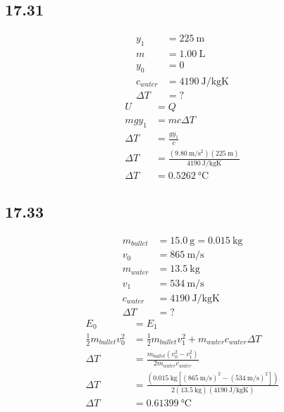 \documentclass{article}
\begin{document}
\subsection{17.31}

\begin{align*}
	y_1 & = \SI{225}{\meter} \\
	m & = \SI{1.00}{\liter} \\
	y_0 & = 0 \\
	c_{water} & = \SI{4190}{\joule \per \kilogram \kelvin} \\
	\Delta T & = ?
\end{align*}
\begin{align*}
	U & = Q \\
	mgy_1 & = mc\Delta T \\
	\Delta T & = \frac{ gy_1 }{ c } \\
	\Delta T & = \frac{ (\SI{9.80}{\meter \per \second \squared})(\SI{225}{\meter}) }{ \SI{4190}{\joule \per \kilogram \kelvin} } \\
	\Delta T & = \SI{0.5262}{\celsius}
\end{align*}

\subsection{17.33}

\begin{align*}
	m_{bullet} & = \SI{15.0}{\gram} = \SI{0.015}{\kilogram} \\
	v_0 & = \SI{865}{\meter \per \second} \\
	m_{water} & = \SI{13.5}{\kilogram} \\
	v_1 & = \SI{534}{\meter \per \second} \\
	c_{water} & = \SI{4190}{\joule \per \kilogram \kelvin} \\
	\Delta T & = ?
\end{align*}
\begin{align*}
	E_0 & = E_1 \\
	\frac{1}{2}m_{bullet}v_0^2 & = \frac{1}{2}m_{bullet}v_1^2 + m_{water}c_{water}\Delta T \\
	\Delta T & = \frac{ m_{bullet}(v_0^2 - v_1^2) }{ 2m_{water}c_{water} } \\
	\Delta T & = \frac{ (\SI{0.015}{\kilogram} \left[ (\SI{865}{\meter \per \second})^2 - (\SI{534}{\meter \per \second})^2 \right]) }{ 2(\SI{13.5}{\kilogram})(\SI{4190}{\joule \per \kilogram \kelvin}) } \\
	\Delta T & = \SI{0.61399}{\celsius}
\end{align*}
\end{document}

